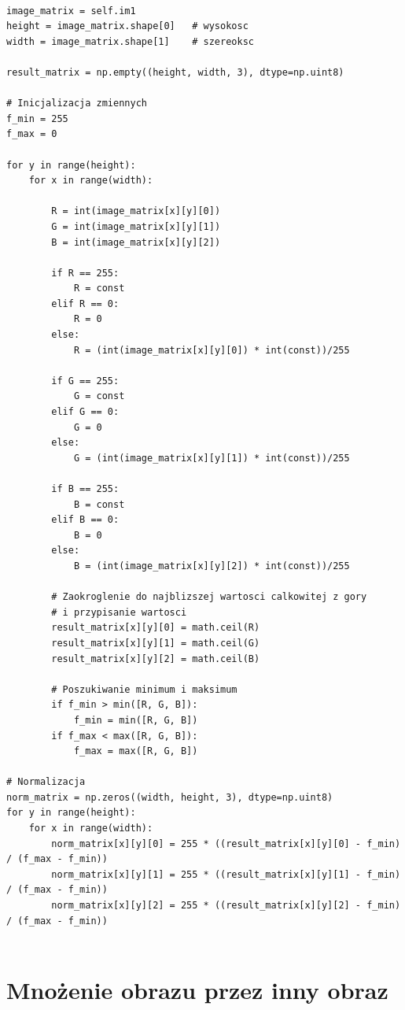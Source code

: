 \documentclass[final,a4paper,openany,12pt]{mwbk}
\begin{document}
\begin{lstlisting}[caption=Mnożenie obrazu barwowego przez zadaną liczbę]

image_matrix = self.im1
height = image_matrix.shape[0]   # wysokosc
width = image_matrix.shape[1]    # szereoksc

result_matrix = np.empty((height, width, 3), dtype=np.uint8)

# Inicjalizacja zmiennych
f_min = 255
f_max = 0

for y in range(height):
    for x in range(width):  

        R = int(image_matrix[x][y][0])
        G = int(image_matrix[x][y][1])
        B = int(image_matrix[x][y][2])

        if R == 255:
            R = const
        elif R == 0:
            R = 0
        else:
            R = (int(image_matrix[x][y][0]) * int(const))/255 
        
        if G == 255:
            G = const
        elif G == 0:
            G = 0
        else:
            G = (int(image_matrix[x][y][1]) * int(const))/255 
        
        if B == 255:
            B = const
        elif B == 0:
            B = 0
        else:
            B = (int(image_matrix[x][y][2]) * int(const))/255 

        # Zaokroglenie do najblizszej wartosci calkowitej z gory
        # i przypisanie wartosci
        result_matrix[x][y][0] = math.ceil(R)
        result_matrix[x][y][1] = math.ceil(G)
        result_matrix[x][y][2] = math.ceil(B)

        # Poszukiwanie minimum i maksimum                
        if f_min > min([R, G, B]):
            f_min = min([R, G, B])
        if f_max < max([R, G, B]):
            f_max = max([R, G, B])

# Normalizacja
norm_matrix = np.zeros((width, height, 3), dtype=np.uint8)
for y in range(height):
    for x in range(width):
        norm_matrix[x][y][0] = 255 * ((result_matrix[x][y][0] - f_min) / (f_max - f_min))
        norm_matrix[x][y][1] = 255 * ((result_matrix[x][y][1] - f_min) / (f_max - f_min))
        norm_matrix[x][y][2] = 255 * ((result_matrix[x][y][2] - f_min) / (f_max - f_min))


\end{lstlisting}

\section {Mnożenie obrazu przez inny obraz}
\hfill
\\\\
\indent
\end{document}
